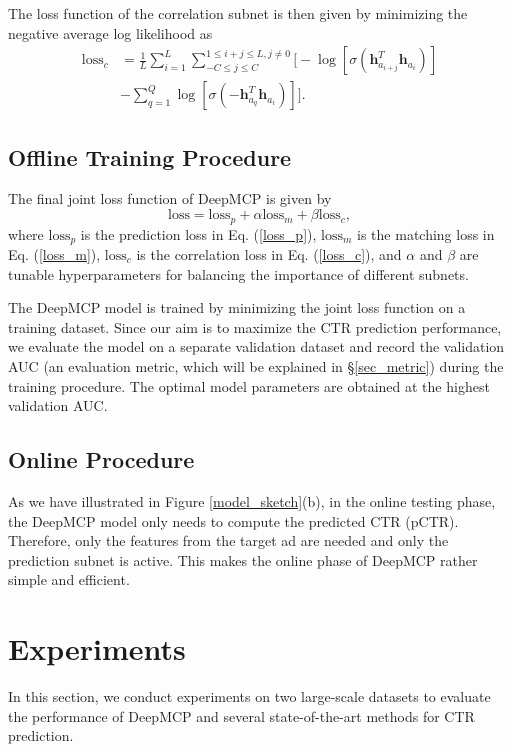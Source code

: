 \documentclass{article}
\begin{document}
The loss function of the correlation subnet is then given by minimizing the negative average log likelihood as
\begin{align}
\mathrm{loss}_c & = \frac{1}{L} \sum_{i=1}^L \sum_{-C \leq j \leq C}^{1\leq i+j \leq L, j \neq 0} \Big[- \log \left[\sigma(\mathbf{h}_{a_{i+j}}^T \mathbf{h}_{a_i}) \right] \nonumber \\
& - \sum_{q=1}^Q \log \left[\sigma(-\mathbf{h}_{a_q}^T \mathbf{h}_{a_i}) \right] \Big]. \label{loss_c}
\end{align}


\subsection{Offline Training Procedure}
The final joint loss function of DeepMCP is given by
\begin{equation} \label{loss}
\mathrm{loss} = \mathrm{loss}_p + \alpha \mathrm{loss}_m + \beta \mathrm{loss}_c,
\end{equation}
where $\mathrm{loss}_p$ is the prediction loss in Eq. (\ref{loss_p}), $\mathrm{loss}_m$ is the matching loss in Eq. (\ref{loss_m}), $\mathrm{loss}_c$ is the correlation loss in Eq. (\ref{loss_c}), and $\alpha$ and $\beta$ are tunable hyperparameters for balancing the importance of different subnets.

The DeepMCP model is trained by minimizing the joint loss function on a training dataset.
Since our aim is to maximize the CTR prediction performance, we evaluate the model on a separate validation dataset and record the validation AUC (an evaluation metric, which will be explained in \S\ref{sec_metric}) during the training procedure. The optimal model parameters are obtained at the highest validation AUC.

\subsection{Online Procedure}
As we have illustrated in Figure \ref{model_sketch}(b), in the online testing phase, the DeepMCP model only needs to compute the predicted CTR (pCTR). Therefore, only the features from the target ad are needed and only the prediction subnet is active. This makes the online phase of DeepMCP rather simple and efficient.

\section{Experiments}
In this section, we conduct experiments on two large-scale datasets to evaluate the performance of DeepMCP and several state-of-the-art methods for CTR prediction.
\end{document}
